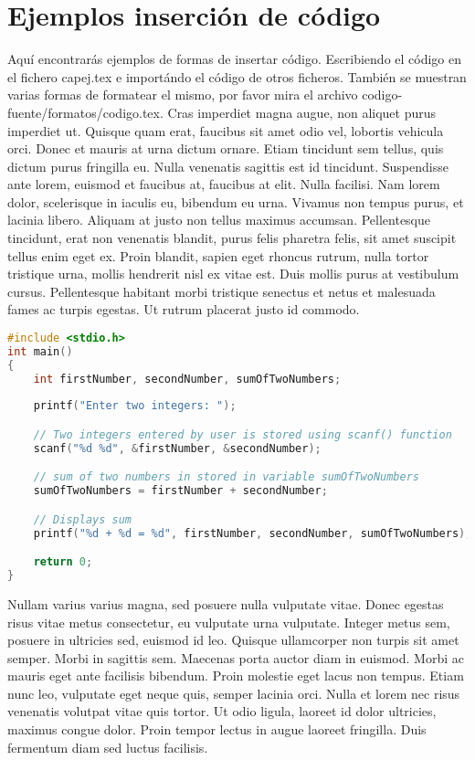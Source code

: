 \section{Ejemplos inserción de código}
Aquí encontrarás ejemplos de formas de insertar código. Escribiendo el código en  el fichero capej.tex e importándo el código de otros ficheros. También se muestran varias formas de formatear el mismo, por favor mira el archivo codigo-fuente/formatos/codigo.tex.
Cras imperdiet magna augue, non aliquet purus imperdiet ut. Quisque quam erat, faucibus sit amet odio vel, lobortis vehicula orci. Donec et mauris at urna dictum ornare. Etiam tincidunt sem tellus, quis dictum purus fringilla eu. Nulla venenatis sagittis est id tincidunt. Suspendisse ante lorem, euismod et faucibus at, faucibus at elit. Nulla facilisi. Nam lorem dolor, scelerisque in iaculis eu, bibendum eu urna. Vivamus non tempus purus, et\cite{book:vim-ref} lacinia libero. Aliquam at justo non tellus maximus accumsan. Pellentesque tincidunt, erat non venenatis blandit, purus felis pharetra felis, sit amet suscipit tellus enim eget ex. Proin blandit, sapien eget rhoncus rutrum, nulla tortor tristique urna, mollis hendrerit nisl ex vitae est. Duis mollis purus at vestibulum cursus. Pellentesque habitant morbi tristique senectus et netus et malesuada fames ac turpis egestas. Ut rutrum placerat justo id commodo.
\begin{lstlisting}[language=C, caption=Ejercio de prueba \cite{web:vimgolf}]
#include <stdio.h>
int main()
{
    int firstNumber, secondNumber, sumOfTwoNumbers;
    
    printf("Enter two integers: ");

    // Two integers entered by user is stored using scanf() function
    scanf("%d %d", &firstNumber, &secondNumber);

    // sum of two numbers in stored in variable sumOfTwoNumbers
    sumOfTwoNumbers = firstNumber + secondNumber;

    // Displays sum      
    printf("%d + %d = %d", firstNumber, secondNumber, sumOfTwoNumbers);

    return 0;
}
\end{lstlisting}

Nullam varius varius magna, sed posuere nulla vulputate vitae. Donec egestas risus vitae metus consectetur, eu vulputate urna vulputate. Integer metus sem, posuere in ultricies sed, euismod id leo. Quisque ullamcorper non turpis sit amet semper. Morbi in sagittis sem. Maecenas porta auctor diam in euismod. Morbi ac mauris eget ante facilisis bibendum. Proin molestie eget lacus non tempus. Etiam nunc leo, vulputate eget neque quis, semper lacinia orci. Nulla et lorem nec risus venenatis volutpat vitae quis tortor. Ut odio ligula, laoreet id dolor ultricies, maximus congue dolor. Proin tempor lectus in augue laoreet fringilla. Duis fermentum diam sed luctus facilisis.



